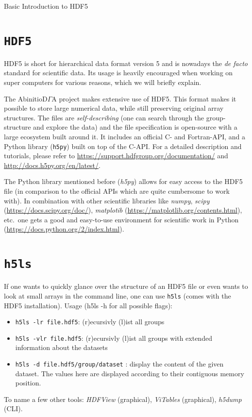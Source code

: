 \documentclass[a4paper,11pt]{article}
\numberwithin{equation}{section} %
\begin{document}
\begin{Huge}
  Basic Introduction to HDF5
\end{Huge}
\section{\protect\Verb=HDF5=}
HDF5 is short for hierarchical data format version 5 and is nowadays the \emph{de facto} standard for scientific data.
Its usage is heavily encouraged when working on super computers for various reasons, which we will briefly explain.


The AbinitioD$\Gamma$A project makes extensive use of HDF5. 
This format makes it possible to store large numerical data, while still preserving original array structures. 
The files are \emph{self-describing} (one can search through the group-structure and explore the data)
and the file specification is open-source with a large ecosystem built around it.
It includes an official C- and Fortran-API, and a Python library (\verb|h5py|) built on top of the C-API.
For a detailed description and tutorials, please refer to \url{https://support.hdfgroup.org/documentation/} and \url{http://docs.h5py.org/en/latest/}.

The Python library mentioned before (\emph{h5py}) allows for easy access to the HDF5 file
(in comparison to the official APIs which are quite cumbersome to work with).
In combination with other scientific libraries like \emph{numpy}, \emph{scipy} (\url{https://docs.scipy.org/doc/}), \emph{matplotib} (\url{https://matplotlib.org/contents.html}),
etc.~one gets a good and easy-to-use environment for scientific work in Python (\url{https://docs.python.org/2/index.html}).

\section{\protect\Verb=h5ls=}

If one wants to quickly glance over the structure of an HDF5 file or even wants to look at small arrays
in the command line, one can use \verb|h5ls| (comes with the HDF5 installation). Usage (h5ls -h for all possible flags):

\begin{itemize}
\item{{\color{blue}\verb|h5ls -lr file.hdf5|}: (r)ecursivly (l)ist all groups}
\item{{\color{blue}\verb|h5ls -vlr file.hdf5|}: (r)ecursivly (l)ist all groups with extended information about the datasets}
\item{{\color{blue}\verb|h5ls -d file.hdf5/group/dataset|} : display the content of the given dataset. The values here are displayed according to their contiguous memory position.}
\end{itemize}
To name a few other tools: \emph{HDFView} (graphical), \emph{ViTables} (graphical), \emph{h5dump} (CLI).
\end{document}
